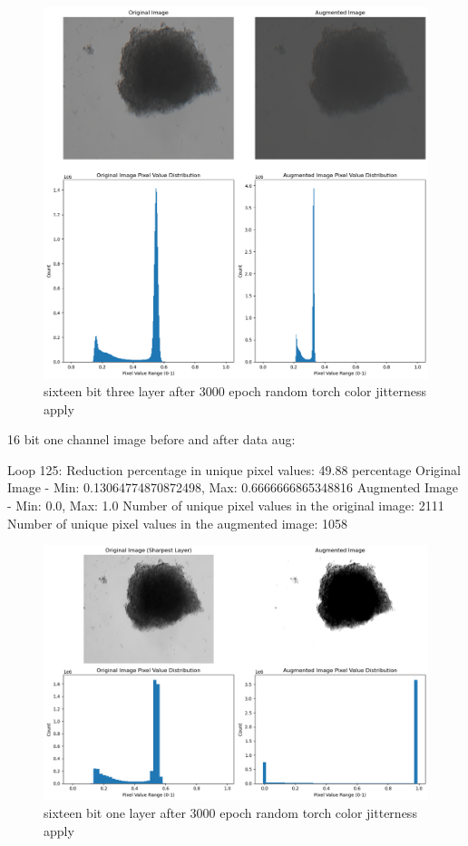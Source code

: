 \documentclass[12pt,twoside,a4paper,parskip]{scrbook} %
\begin{document}
\begin{figure}[H]
  \centering
  \includegraphics[scale=0.6]{figures/16bithree2.png} 
  \caption{sixteen bit three layer after 3000 epoch random torch color jitterness apply}
  \label{fig:16bit_three_version2}
\end{figure}

16 bit one channel image before and after data aug:

Loop 125: Reduction percentage in unique pixel values: 49.88 percentage
Original Image - Min: 0.13064774870872498, Max: 0.6666666865348816
Augmented Image - Min: 0.0, Max: 1.0
Number of unique pixel values in the original image: 2111
Number of unique pixel values in the augmented image: 1058

\begin{figure}[H]
  \centering
  \includegraphics[scale=0.6]{figures/16bit_onen.png} 
  \caption{sixteen bit one layer after 3000 epoch random torch color jitterness apply}
  \label{fig:16bit_n one}
\end{figure}
\end{document}

